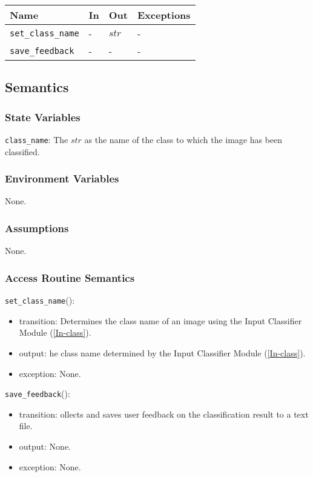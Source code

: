 \documentclass[12pt, titlepage]{article}
\def\code#1{\texttt{#1}}
\begin{document}
\begin{center}
\begin{tabular}{p{3cm} p{4cm} p{4cm} p{3cm}}
\hline
\textbf{Name} & \textbf{In} & \textbf{Out} & \textbf{Exceptions} \\
\hline
\code{set\_class\_name} & - & $str$ & - \\
\code{save\_feedback} & - & - &  -\\
\hline
\end{tabular}
\end{center}

\subsection{Semantics}

\subsubsection{State Variables}
\code{class\_name}: The $str$ as the name of the class to which the image has been classified.

\subsubsection{Environment Variables}
None.

\subsubsection{Assumptions}
None.

\subsubsection{Access Routine Semantics}

\noindent \code{set\_class\_name}():
\begin{itemize}
  \item transition: Determines the class name of an image using the Input Classifier Module (\ref{In-class}).
  \item output: he class name determined by the Input Classifier Module (\ref{In-class}).
  \item exception: None.
\end{itemize}

\noindent \code{save\_feedback}():
\begin{itemize}
  \item transition: ollects and saves user feedback on the classification result to a text file.
  \item output: None.
  \item exception: None.
\end{itemize}
\end{document}
